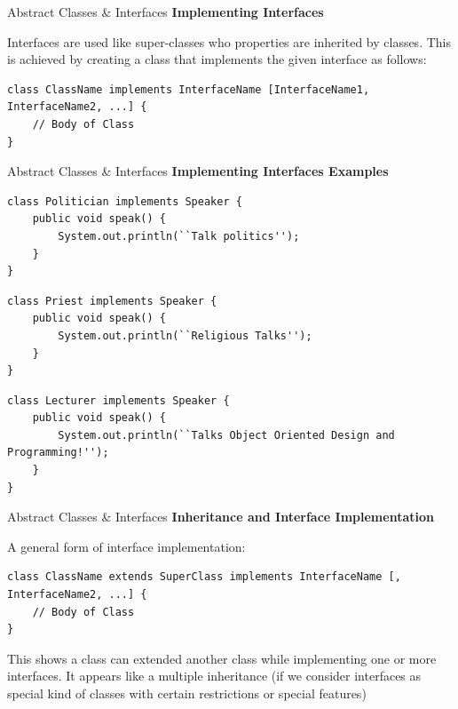 \documentclass[14pt]{beamer}
\begin{document}
\begin{frame}[fragile]{Abstract Classes \& Interfaces}
 \textbf{Implementing Interfaces}
 
 Interfaces are used like super-classes who properties are inherited by classes. This is achieved by creating a class that implements the given interface as follows: 
 \begin{lstlisting}[numbers=none, frame = single]
class ClassName implements InterfaceName [InterfaceName1, InterfaceName2, ...] {
    // Body of Class
}
 \end{lstlisting}
\end{frame}

\begin{frame}[fragile]{Abstract Classes \& Interfaces}
\textbf{Implementing Interfaces Examples}
\begin{lstlisting}[numbers=none, frame = single, basicstyle=\tiny]
class Politician implements Speaker {
    public void speak() {
        System.out.println(``Talk politics'');
    }
}
\end{lstlisting}
\begin{lstlisting}[numbers=none, frame = single, basicstyle=\tiny]
class Priest implements Speaker {
    public void speak() {
        System.out.println(``Religious Talks'');
    }
}
\end{lstlisting}
\begin{lstlisting}[numbers=none, frame = single, basicstyle=\tiny]
class Lecturer implements Speaker {
    public void speak() {
        System.out.println(``Talks Object Oriented Design and Programming!'');
    }
}
\end{lstlisting}
\end{frame}

\begin{frame}[fragile]{Abstract Classes \& Interfaces}
 \textbf{Inheritance and Interface Implementation}
 \begin{block}{A general form of interface implementation:}
 \begin{lstlisting}[numbers=none, basicstyle=\tiny]
class ClassName extends SuperClass implements InterfaceName [, InterfaceName2, ...] {
    // Body of Class
}
\end{lstlisting}
\end{block}
This shows a class can extended another class while implementing one or more interfaces. It appears like a multiple inheritance (if we consider interfaces as special kind of classes with certain restrictions or special features)
\end{frame}
\end{document}
